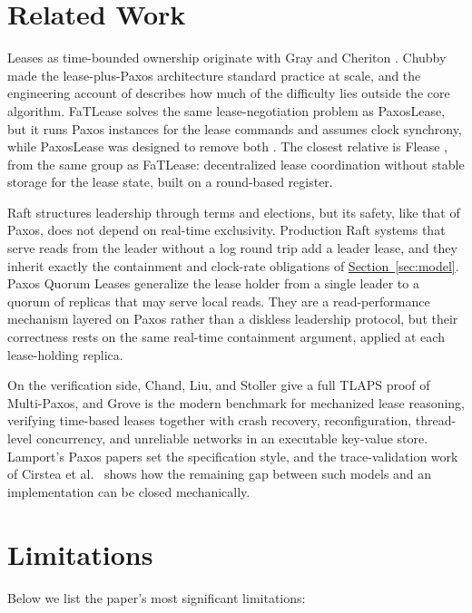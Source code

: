 \documentclass[final,5p,times,twocolumn,number]{elsarticle}
\newcommand{\secref}[1]{\hyperref[#1]{Section~\ref*{#1}}}
\begin{document}
\section{Related Work}\label{sec:related}

Leases as time-bounded ownership originate with Gray and Cheriton \cite{ref3}.  Chubby \cite{ref6} made the lease-plus-Paxos architecture standard practice at scale, and the engineering account of \cite{ref7} describes how much of the difficulty lies outside the core algorithm.  FaTLease \cite{ref8} solves the same lease-negotiation problem as PaxosLease, but it runs Paxos instances for the lease commands and assumes clock synchrony, while PaxosLease was designed to remove both \cite{ref1}.  The closest relative is Flease \cite{ref10}, from the same group as FaTLease: decentralized lease coordination without stable storage for the lease state, built on a round-based register.

Raft \cite{ref4} structures leadership through terms and elections, but its safety, like that of Paxos, does not depend on real-time exclusivity.  Production Raft systems that serve reads from the leader without a log round trip add a leader lease, and they inherit exactly the containment and clock-rate obligations of \secref{sec:model}.  Paxos Quorum Leases \cite{ref12} generalize the lease holder from a single leader to a quorum of replicas that may serve local reads.  They are a read-performance mechanism layered on Paxos rather than a diskless leadership protocol, but their correctness rests on the same real-time containment argument, applied at each lease-holding replica.

On the verification side, Chand, Liu, and Stoller \cite{ref5} give a full TLAPS proof of Multi-Paxos, and Grove \cite{ref11} is the modern benchmark for mechanized lease reasoning, verifying time-based leases together with crash recovery, reconfiguration, thread-level concurrency, and unreliable networks in an executable key-value store.  Lamport's Paxos papers \cite{ref2,ref9} set the specification style, and the trace-validation work of Cirstea et al.\ \cite{ref13} shows how the remaining gap between such models and an implementation can be closed mechanically.

\section{Limitations}\label{sec:limitations}

Below we list the paper's most significant limitations:
\end{document}
